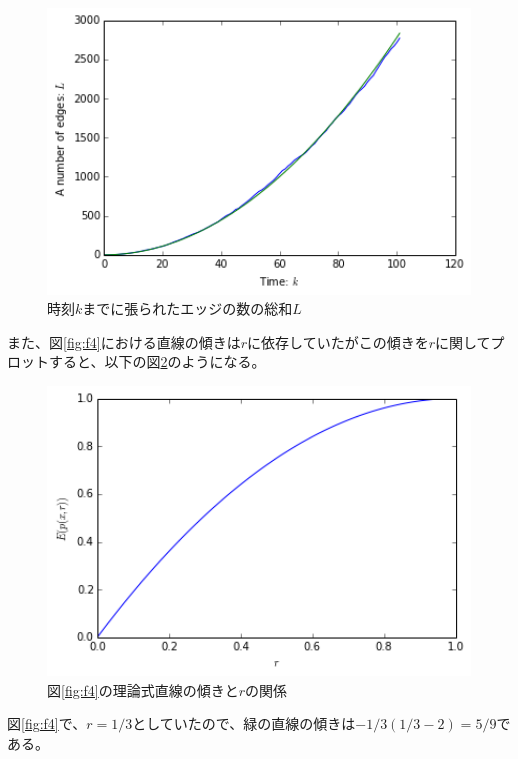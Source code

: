 \begin{figure}[H]
    \begin{center}
        \includegraphics[width=12.5cm]{../download2_4.png}
        \caption{時刻$k$までに張られたエッジの数の総和$L$}
        \label{fig:f6}
    \end{center}
\end{figure}

また、図\ref{fig:f4}における直線の傾きは$r$に依存していたがこの傾きを$r$に関してプロットすると、以下の図\ref{fig:f7}のようになる。

\begin{figure}[H]
    \begin{center}
        \includegraphics[width=12.5cm]{../download2_5.png}
        \caption{図\ref{fig:f4}の理論式直線の傾きと$r$の関係}
        \label{fig:f7}
    \end{center}
\end{figure}

図\ref{fig:f4}で、$r=1/3$としていたので、緑の直線の傾きは$-1/3(1/3-2) = 5/9$である。
